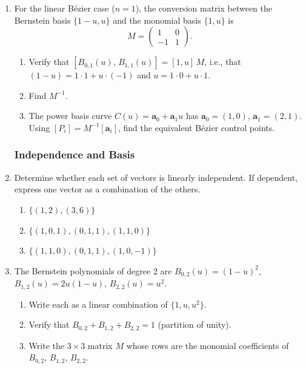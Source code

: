 \begin{enumerate}
\item For the linear B\'{e}zier case ($n=1$), the conversion matrix between the
Bernstein basis $\{1-u, u\}$ and the monomial basis $\{1, u\}$ is
\[
  M = \begin{pmatrix} 1 & 0 \\ -1 & 1 \end{pmatrix}.
\]
\begin{enumerate}
  \item Verify that $[B_{0,1}(u),\, B_{1,1}(u)] = [1, u]\, M$, i.e., that
        $(1-u) = 1 \cdot 1 + u \cdot (-1)$ and $u = 1 \cdot 0 + u \cdot 1$.
  \item Find $M^{-1}$.
  \item The power basis curve $C(u) = \mathbf{a}_0 + \mathbf{a}_1 u$ has $\mathbf{a}_0 = (1,0)$,
        $\mathbf{a}_1 = (2,1)$.
        Using $[P_i] = M^{-1}[\mathbf{a}_i]$, find the equivalent B\'{e}zier control points.
\end{enumerate}

\subsubsection*{Independence and Basis}

\item Determine whether each set of vectors is linearly independent.
If dependent, express one vector as a combination of the others.
\begin{enumerate}
  \item $\{(1, 2), (3, 6)\}$
  \item $\{(1,0,1), (0,1,1), (1,1,0)\}$
  \item $\{(1,1,0), (0,1,1), (1,0,-1)\}$
\end{enumerate}

\item The Bernstein polynomials of degree 2 are
$B_{0,2}(u) = (1-u)^2$, $B_{1,2}(u) = 2u(1-u)$, $B_{2,2}(u) = u^2$.
\begin{enumerate}
  \item Write each as a linear combination of $\{1, u, u^2\}$.
  \item Verify that $B_{0,2} + B_{1,2} + B_{2,2} = 1$ (partition of unity).
  \item Write the $3 \times 3$ matrix $M$ whose rows are the monomial
        coefficients of $B_{0,2}$, $B_{1,2}$, $B_{2,2}$.
\end{enumerate}


\end{enumerate}
